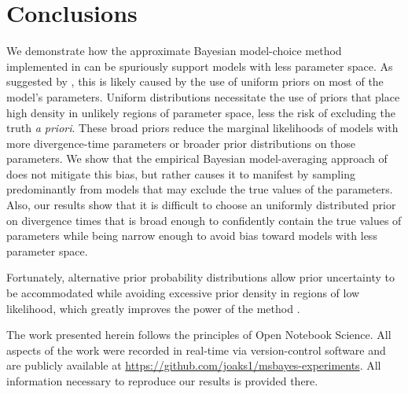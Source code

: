 \section{Conclusions}
We demonstrate how the approximate Bayesian model-choice method implemented in
\msb can be spuriously support models with less parameter space.
As suggested by \citet{Oaks2012}, this is likely caused by the use of uniform
priors on most of the model's parameters.
Uniform distributions necessitate the use of priors that place high density in
unlikely regions of parameter space, less the risk of excluding the truth
\emph{a priori}.
These broad priors reduce the marginal likelihoods of models with more
divergence-time parameters or broader prior distributions on those parameters.
We show that the empirical Bayesian model-averaging approach of
\citet{Hickerson2013} does not mitigate this bias, but rather causes it to
manifest by sampling predominantly from models that may exclude the true values
of the parameters.
Also, our results show that it is difficult to choose an uniformly distributed
prior on divergence times that is broad enough to confidently contain the true
values of parameters while being narrow enough to avoid bias toward models with
less parameter space.

Fortunately, alternative prior probability distributions allow prior
uncertainty to be accommodated while avoiding excessive prior density in
regions of low likelihood, which greatly improves the power of the method
\citep{Oaks2014dpp}.


The work presented herein follows the principles of Open Notebook Science.
All aspects of the work were recorded in real-time via version-control software
and are publicly available at
\href{https://github.com/joaks1/msbayes-experiments}{\url{https://github.com/joaks1/msbayes-experiments}}.
All information necessary to reproduce our results is provided there.

